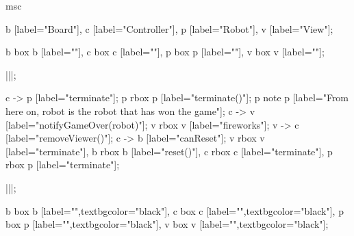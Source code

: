 \begin{msc}
msc
{

b [label="Board"],
c [label="Controller"],
p [label="Robot"],
v [label="View"];

b box b [label=""],
c box c [label=""],
p box p [label=""],
v box v [label=""];

|||;

c -> p [label="terminate"];
p rbox p [label="terminate()"];
p note p [label="From here on, robot is the robot that has won the game"];
c -> v [label="notifyGameOver(robot)"];
v rbox v [label="fireworks"];
v -> c [label="removeViewer()"];
c -> b [label="canReset"];
v rbox v [label="terminate"],
b rbox b [label="reset()"],
c rbox c [label="terminate"],
p rbox p [label="terminate"];


|||;

b box b [label="",textbgcolor="black"],
c box c [label="",textbgcolor="black"],
p box p [label="",textbgcolor="black"],
v box v [label="",textbgcolor="black"];

}
\end{msc}
